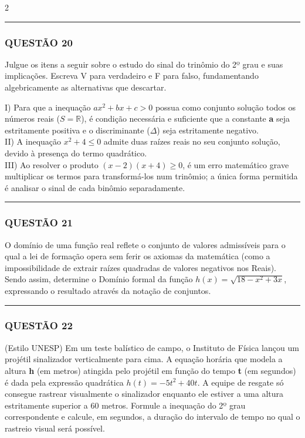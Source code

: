 \documentclass[twoside, 10pt, a4paper]{article}
\begin{document}
\begin{multicols*}{2}
\vspace{0cm} \noindent\textcolor{CorLinha}{\rule{\linewidth}{0.5pt}} \vspace{-0.2cm}
\subsubsection*{QUESTÃO 20}
Julgue os itens a seguir sobre o estudo do sinal do trinômio do 2º grau e suas implicações. Escreva V para verdadeiro e F para falso, fundamentando algebricamente as alternativas que descartar.

I) Para que a inequação $ ax^2 + bx + c > 0 $ possua como conjunto solução todos os números reais ($ S = \mathbb{R} $), é condição necessária e suficiente que a constante \textbf{a} seja estritamente positiva e o discriminante ($ \Delta $) seja estritamente negativo.\\[0.3cm]
II) A inequação $ x^2 + 4 \le 0 $ admite duas raízes reais no seu conjunto solução, devido à presença do termo quadrático.\\[0.3cm]
III) Ao resolver o produto $ (x - 2)(x + 4) \ge 0 $, é um erro matemático grave multiplicar os termos para transformá-los num trinômio; a única forma permitida é analisar o sinal de cada binômio separadamente.

\vspace{0cm} \noindent\textcolor{CorLinha}{\rule{\linewidth}{0.5pt}} \vspace{-0.2cm}
\subsubsection*{QUESTÃO 21}
O domínio de uma função real reflete o conjunto de valores admissíveis para o qual a lei de formação opera sem ferir os axiomas da matemática (como a impossibilidade de extrair raízes quadradas de valores negativos nos Reais). Sendo assim, determine o Domínio formal da função $ h(x) = \sqrt{18 - x^2 + 3x} $, expressando o resultado através da notação de conjuntos.

\vspace{0cm} \noindent\textcolor{CorLinha}{\rule{\linewidth}{0.5pt}} \vspace{-0.2cm}
\subsubsection*{QUESTÃO 22}
(Estilo UNESP) Em um teste balístico de campo, o Instituto de Física lançou um projétil sinalizador verticalmente para cima. A equação horária que modela a altura \textbf{h} (em metros) atingida pelo projétil em função do tempo \textbf{t} (em segundos) é dada pela expressão quadrática $ h(t) = -5t^2 + 40t $. A equipe de resgate só consegue rastrear visualmente o sinalizador enquanto ele estiver a uma altura estritamente superior a 60 metros. Formule a inequação do 2º grau correspondente e calcule, em segundos, a duração do intervalo de tempo no qual o rastreio visual será possível.


\end{multicols*}
\end{document}

